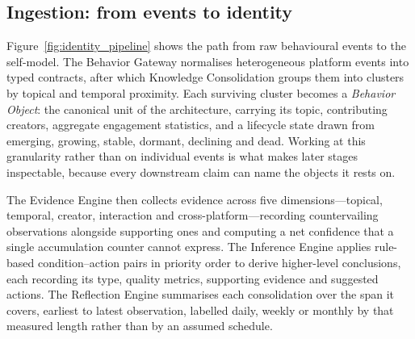 \documentclass[conference]{IEEEtran}
\begin{document}
\subsection{Ingestion: from events to identity}
Figure~\ref{fig:identity_pipeline} shows the path from raw behavioural events to the self-model. The Behavior Gateway normalises heterogeneous platform events into typed contracts, after which Knowledge Consolidation groups them into clusters by topical and temporal proximity. Each surviving cluster becomes a \emph{Behavior Object}: the canonical unit of the architecture, carrying its topic, contributing creators, aggregate engagement statistics, and a lifecycle state drawn from emerging, growing, stable, dormant, declining and dead. Working at this granularity rather than on individual events is what makes later stages inspectable, because every downstream claim can name the objects it rests on.

The Evidence Engine then collects evidence across five dimensions---topical, temporal, creator, interaction and cross-platform---recording countervailing observations alongside supporting ones and computing a net confidence that a single accumulation counter cannot express. The Inference Engine applies rule-based condition--action pairs in priority order to derive higher-level conclusions, each recording its type, quality metrics, supporting evidence and suggested actions. The Reflection Engine summarises each consolidation over the span it covers, earliest to latest observation, labelled daily, weekly or monthly by that measured length rather than by an assumed schedule.
\end{document}
